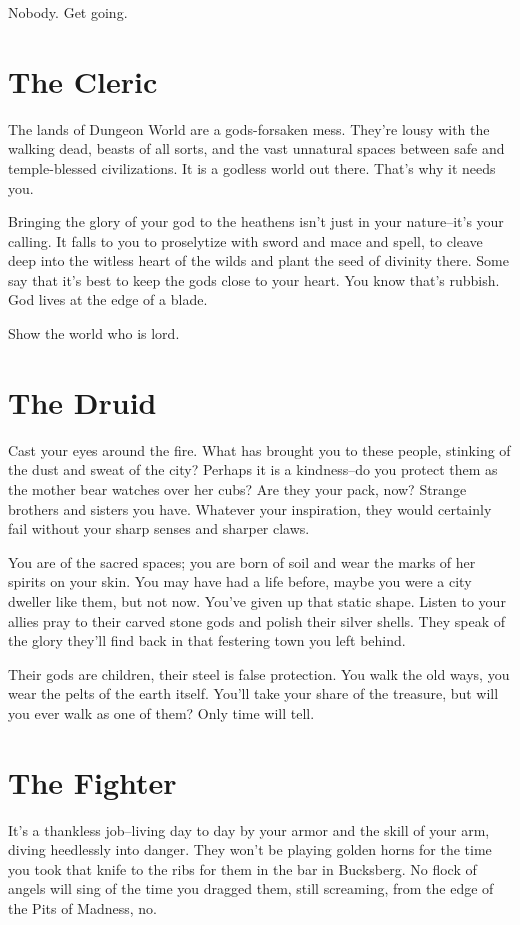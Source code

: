  Nobody. Get going.
\section*{The Cleric}


 The lands of Dungeon World are a gods-forsaken mess. They're lousy with the walking dead, beasts of all sorts, and the vast unnatural spaces between safe and temple-blessed civilizations. It is a godless world out there. That's why it needs you.


 Bringing the glory of your god to the heathens isn't just in your nature--it's your calling. It falls to you to proselytize with sword and mace and spell, to cleave deep into the witless heart of the wilds and plant the seed of divinity there. Some say that it's best to keep the gods close to your heart. You know that's rubbish. God lives at the edge of a blade.


 Show the world who is lord.
\section*{The Druid}


 Cast your eyes around the fire. What has brought you to these people, stinking of the dust and sweat of the city? Perhaps it is a kindness--do you protect them as the mother bear watches over her cubs? Are they your pack, now? Strange brothers and sisters you have. Whatever your inspiration, they would certainly fail without your sharp senses and sharper claws.


 You are of the sacred spaces; you are born of soil and wear the marks of her spirits on your skin. You may have had a life before, maybe you were a city dweller like them, but not now. You've given up that static shape. Listen to your allies pray to their carved stone gods and polish their silver shells. They speak of the glory they'll find back in that festering town you left behind.


 Their gods are children, their steel is false protection. You walk the old ways, you wear the pelts of the earth itself. You'll take your share of the treasure, but will you ever walk as one of them? Only time will tell.
\section*{The Fighter}


 It's a thankless job--living day to day by your armor and the skill of your arm, diving heedlessly into danger. They won't be playing golden horns for the time you took that knife to the ribs for them in the bar in Bucksberg. No flock of angels will sing of the time you dragged them, still screaming, from the edge of the Pits of Madness, no.


